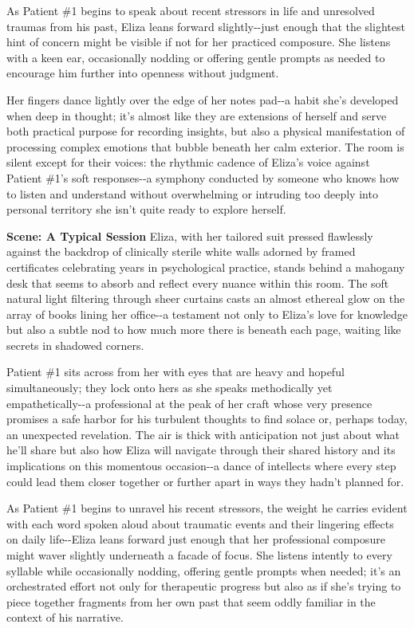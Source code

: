 \documentclass[12pt]{report}  %
\begin{document}
As Patient \#1 begins to speak about recent stressors in life and
unresolved traumas from his past, Eliza leans forward slightly-\/-just
enough that the slightest hint of concern might be visible if not for
her practiced composure. She listens with a keen ear, occasionally
nodding or offering gentle prompts as needed to encourage him further
into openness without judgment.

Her fingers dance lightly over the edge of her notes pad-\/-a habit
she's developed when deep in thought; it's almost like they are
extensions of herself and serve both practical purpose for recording
insights, but also a physical manifestation of processing complex
emotions that bubble beneath her calm exterior. The room is silent
except for their voices: the rhythmic cadence of Eliza's voice against
Patient \#1's soft responses-\/-a symphony conducted by someone who
knows how to listen and understand without overwhelming or intruding too
deeply into personal territory she isn't quite ready to explore herself.

\textbf{Scene: A Typical Session} Eliza, with her tailored suit pressed
flawlessly against the backdrop of clinically sterile white walls
adorned by framed certificates celebrating years in psychological
practice, stands behind a mahogany desk that seems to absorb and reflect
every nuance within this room. The soft natural light filtering through
sheer curtains casts an almost ethereal glow on the array of books
lining her office-\/-a testament not only to Eliza's love for knowledge
but also a subtle nod to how much more there is beneath each page,
waiting like secrets in shadowed corners.

Patient \#1 sits across from her with eyes that are heavy and hopeful
simultaneously; they lock onto hers as she speaks methodically yet
empathetically-\/-a professional at the peak of her craft whose very
presence promises a safe harbor for his turbulent thoughts to find
solace or, perhaps today, an unexpected revelation. The air is thick
with anticipation not just about what he'll share but also how Eliza
will navigate through their shared history and its implications on this
momentous occasion-\/-a dance of intellects where every step could lead
them closer together or further apart in ways they hadn't planned for.

As Patient \#1 begins to unravel his recent stressors, the weight he
carries evident with each word spoken aloud about traumatic events and
their lingering effects on daily life-\/-Eliza leans forward just enough
that her professional composure might waver slightly underneath a facade
of focus. She listens intently to every syllable while occasionally
nodding, offering gentle prompts when needed; it's an orchestrated
effort not only for therapeutic progress but also as if she's trying to
piece together fragments from her own past that seem oddly familiar in
the context of his narrative.
\end{document}
